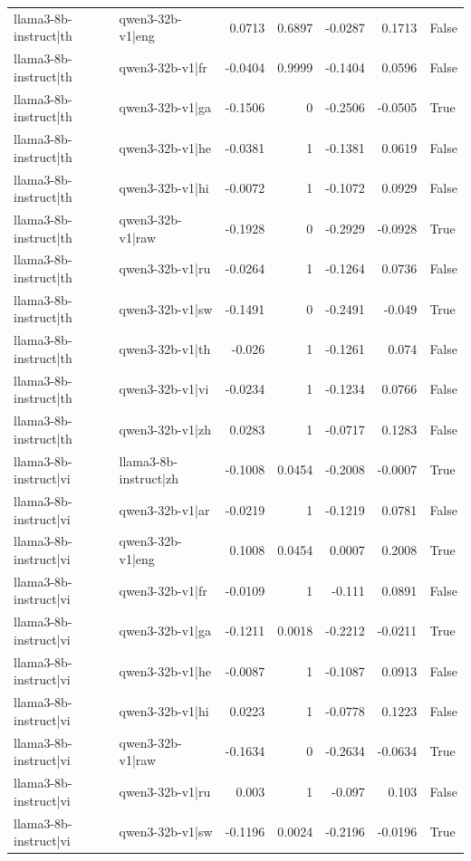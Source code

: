 \begin{table}
\begin{tabular}{l l r r r r l}
llama3-8b-instruct|th & qwen3-32b-v1|eng & 0.0713 & 0.6897 & -0.0287 & 0.1713 & False \\
llama3-8b-instruct|th & qwen3-32b-v1|fr & -0.0404 & 0.9999 & -0.1404 & 0.0596 & False \\
llama3-8b-instruct|th & qwen3-32b-v1|ga & -0.1506 & 0 & -0.2506 & -0.0505 & True \\
llama3-8b-instruct|th & qwen3-32b-v1|he & -0.0381 & 1 & -0.1381 & 0.0619 & False \\
llama3-8b-instruct|th & qwen3-32b-v1|hi & -0.0072 & 1 & -0.1072 & 0.0929 & False \\
llama3-8b-instruct|th & qwen3-32b-v1|raw & -0.1928 & 0 & -0.2929 & -0.0928 & True \\
llama3-8b-instruct|th & qwen3-32b-v1|ru & -0.0264 & 1 & -0.1264 & 0.0736 & False \\
llama3-8b-instruct|th & qwen3-32b-v1|sw & -0.1491 & 0 & -0.2491 & -0.049 & True \\
llama3-8b-instruct|th & qwen3-32b-v1|th & -0.026 & 1 & -0.1261 & 0.074 & False \\
llama3-8b-instruct|th & qwen3-32b-v1|vi & -0.0234 & 1 & -0.1234 & 0.0766 & False \\
llama3-8b-instruct|th & qwen3-32b-v1|zh & 0.0283 & 1 & -0.0717 & 0.1283 & False \\
llama3-8b-instruct|vi & llama3-8b-instruct|zh & -0.1008 & 0.0454 & -0.2008 & -0.0007 & True \\
llama3-8b-instruct|vi & qwen3-32b-v1|ar & -0.0219 & 1 & -0.1219 & 0.0781 & False \\
llama3-8b-instruct|vi & qwen3-32b-v1|eng & 0.1008 & 0.0454 & 0.0007 & 0.2008 & True \\
llama3-8b-instruct|vi & qwen3-32b-v1|fr & -0.0109 & 1 & -0.111 & 0.0891 & False \\
llama3-8b-instruct|vi & qwen3-32b-v1|ga & -0.1211 & 0.0018 & -0.2212 & -0.0211 & True \\
llama3-8b-instruct|vi & qwen3-32b-v1|he & -0.0087 & 1 & -0.1087 & 0.0913 & False \\
llama3-8b-instruct|vi & qwen3-32b-v1|hi & 0.0223 & 1 & -0.0778 & 0.1223 & False \\
llama3-8b-instruct|vi & qwen3-32b-v1|raw & -0.1634 & 0 & -0.2634 & -0.0634 & True \\
llama3-8b-instruct|vi & qwen3-32b-v1|ru & 0.003 & 1 & -0.097 & 0.103 & False \\
llama3-8b-instruct|vi & qwen3-32b-v1|sw & -0.1196 & 0.0024 & -0.2196 & -0.0196 & True \\

\end{tabular}
\end{table}
